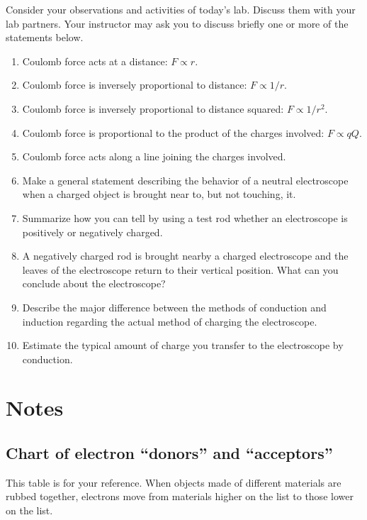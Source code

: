 Consider your observations and activities of today's lab. Discuss them with your lab partners. Your instructor may ask you to discuss briefly one or more of the statements below.
\begin{enumerate}
	\item Coulomb force acts at a distance: $F \propto r$.
	\item Coulomb force is inversely proportional to distance: $F \propto 1/r$. 
	\item Coulomb force is inversely proportional to distance squared: $F \propto 1/r^2$.
	\item Coulomb force is proportional to the product of the charges involved: $F \propto qQ$.
	\item Coulomb force acts along a line joining the charges involved.
	\item Make a general statement describing the behavior of a neutral electroscope when a charged object is brought near to, but not touching, it.
	\item Summarize how you can tell by using a test rod whether an electroscope is positively or negatively charged.
	\item A negatively charged rod is brought nearby a charged electroscope and the leaves of the 
electroscope return to their vertical position.  What can you conclude about the electroscope? 
	\item Describe the major difference between the methods of conduction and induction regarding the actual method of charging the electroscope.
	\item Estimate the typical amount of charge you transfer to the electroscope by conduction.
\end{enumerate}

\newpage
\section*{Notes}
\subsection*{Chart of electron ``donors'' and ``acceptors''}
This table is for your reference. When objects made of different materials are rubbed together, electrons move from materials higher on the list to those lower on the list.

